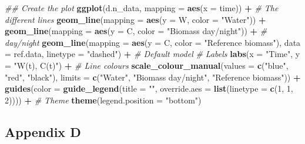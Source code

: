 \documentclass[
]{article}
\newenvironment{Shaded}{\begin{snugshade}}{\end{snugshade}}
\newcommand{\CommentTok}[1]{\textcolor[rgb]{0.56,0.35,0.01}{\textit{#1}}}
\newcommand{\DataTypeTok}[1]{\textcolor[rgb]{0.13,0.29,0.53}{#1}}
\newcommand{\DecValTok}[1]{\textcolor[rgb]{0.00,0.00,0.81}{#1}}
\newcommand{\KeywordTok}[1]{\textcolor[rgb]{0.13,0.29,0.53}{\textbf{#1}}}
\newcommand{\NormalTok}[1]{#1}
\newcommand{\OperatorTok}[1]{\textcolor[rgb]{0.81,0.36,0.00}{\textbf{#1}}}
\newcommand{\StringTok}[1]{\textcolor[rgb]{0.31,0.60,0.02}{#1}}
\begin{document}
\begin{Shaded}
\begin{Highlighting}[numbers=left,,]
\CommentTok{\#\# Create the plot}
\KeywordTok{ggplot}\NormalTok{(d.n\_data, }\DataTypeTok{mapping =} \KeywordTok{aes}\NormalTok{(}\DataTypeTok{x =}\NormalTok{ time)) }\OperatorTok{+}
\StringTok{       }\CommentTok{\# The different lines}
\StringTok{       }\KeywordTok{geom\_line}\NormalTok{(}\DataTypeTok{mapping =} \KeywordTok{aes}\NormalTok{(}\DataTypeTok{y =}\NormalTok{ W, }\DataTypeTok{color =} \StringTok{"Water"}\NormalTok{)) }\OperatorTok{+}
\StringTok{       }\KeywordTok{geom\_line}\NormalTok{(}\DataTypeTok{mapping =} \KeywordTok{aes}\NormalTok{(}\DataTypeTok{y =}\NormalTok{ C, }\DataTypeTok{color =} \StringTok{"Biomass day/night"}\NormalTok{)) }\OperatorTok{+}\StringTok{ }\CommentTok{\# day/night}
\StringTok{       }\KeywordTok{geom\_line}\NormalTok{(}\DataTypeTok{mapping =} \KeywordTok{aes}\NormalTok{(}\DataTypeTok{y =}\NormalTok{ C, }\DataTypeTok{color =} \StringTok{"Reference biomass"}\NormalTok{),}
                 \DataTypeTok{data =}\NormalTok{ ref.data, }\DataTypeTok{linetype =} \StringTok{"dashed"}\NormalTok{) }\OperatorTok{+}\StringTok{ }\CommentTok{\# Default model}
\StringTok{       }\CommentTok{\# Labels}
\StringTok{       }\KeywordTok{labs}\NormalTok{(}\DataTypeTok{x =} \StringTok{"Time"}\NormalTok{, }\DataTypeTok{y =} \StringTok{"W(t), C(t)"}\NormalTok{) }\OperatorTok{+}
\StringTok{       }\CommentTok{\# Line colours}
\StringTok{       }\KeywordTok{scale\_colour\_manual}\NormalTok{(}\DataTypeTok{values =} \KeywordTok{c}\NormalTok{(}\StringTok{"blue"}\NormalTok{, }\StringTok{"red"}\NormalTok{, }\StringTok{"black"}\NormalTok{),}
                           \DataTypeTok{limits =} \KeywordTok{c}\NormalTok{(}\StringTok{"Water"}\NormalTok{, }\StringTok{"Biomass day/night"}\NormalTok{,}
                                      \StringTok{"Reference biomass"}\NormalTok{)) }\OperatorTok{+}
\StringTok{       }\KeywordTok{guides}\NormalTok{(}\DataTypeTok{color =} \KeywordTok{guide\_legend}\NormalTok{(}\DataTypeTok{title =} \StringTok{""}\NormalTok{,}
                                   \DataTypeTok{override.aes =} \KeywordTok{list}\NormalTok{(}\DataTypeTok{linetype =} \KeywordTok{c}\NormalTok{(}\DecValTok{1}\NormalTok{, }\DecValTok{1}\NormalTok{, }\DecValTok{2}\NormalTok{)))) }\OperatorTok{+}
\StringTok{       }\CommentTok{\# Theme}
\StringTok{       }\KeywordTok{theme}\NormalTok{(}\DataTypeTok{legend.position =} \StringTok{"bottom"}\NormalTok{)}
\end{Highlighting}
\end{Shaded}

\hypertarget{appendix-d}{%
\subsection{Appendix D}\label{appendix-d}}
\end{document}
